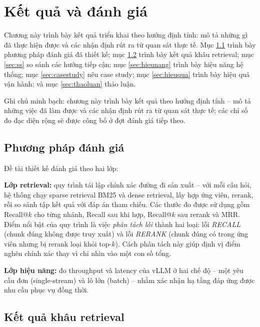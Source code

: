 \chapter{Kết quả và đánh giá}
\label{ch:ketqua}

Chương này trình bày kết quả triển khai theo hướng định tính: mô tả những gì đã thực hiện
được và các nhận định rút ra từ quan sát thực tế. Mục \ref{sec:pp-danhgia} trình bày phương
pháp đánh giá đã thiết kế; mục \ref{sec:kq-retrieval} trình bày kết quả khâu retrieval; mục
\ref{sec:ss} so sánh các hướng tiếp cận; mục \ref{sec:hieunang} trình bày hiệu năng hệ thống;
mục \ref{sec:casestudy} nêu case study; mục \ref{sec:hieuqua} trình bày hiệu quả vận hành;
và mục \ref{sec:thaoluan} thảo luận.

\begin{ghichu}
Ghi chú minh bạch: chương này trình bày kết quả theo hướng định tính -- mô tả những việc đã
làm được và các nhận định rút ra từ quan sát thực tế; các chỉ số đo đạc diện rộng sẽ được
công bố ở đợt đánh giá tiếp theo.
\end{ghichu}

\section{Phương pháp đánh giá}
\label{sec:pp-danhgia}

Đề tài thiết kế đánh giá theo hai lớp:

\textbf{Lớp retrieval:} quy trình tái lập chính xác đường đi sản xuất -- với mỗi câu hỏi,
hệ thống chạy sparse retrieval BM25 và dense retrieval, lấy hợp ứng viên, rerank, rồi so
sánh tập kết quả với đáp án tham chiếu. Các thước đo được sử dụng gồm Recall@$k$ cho từng
nhánh, Recall sau khi hợp, Recall@$k$ sau rerank và MRR. Điểm nổi bật của quy trình là
việc \emph{phân tách lỗi} thành hai loại: lỗi \emph{RECALL} (chunk đúng không được truy
xuất) và lỗi \emph{RERANK} (chunk đúng có trong ứng viên nhưng bị rerank loại khỏi
top-$k$). Cách phân tách này giúp định vị điểm nghẽn chính xác thay vì chỉ nhìn vào một
con số tổng.

\textbf{Lớp hiệu năng:} đo throughput và latency của vLLM ở hai chế độ -- một yêu cầu đơn
(single-stream) và lô lớn (batch) -- nhằm xác nhận hạ tầng đáp ứng được nhu cầu phục vụ
đồng thời.

\section{Kết quả khâu retrieval}
\label{sec:kq-retrieval}

